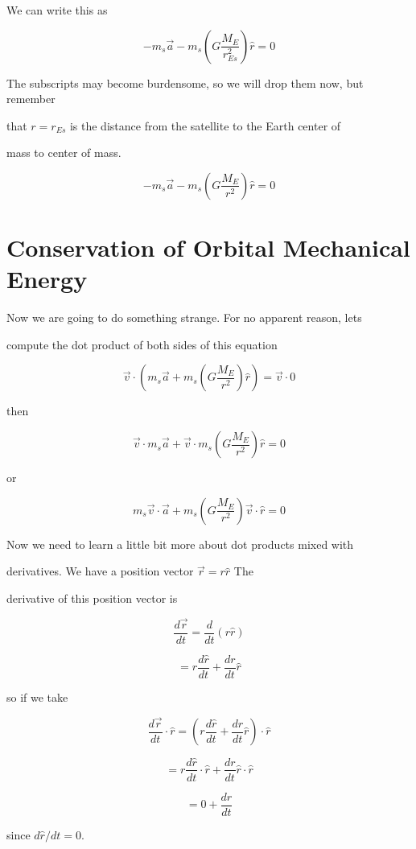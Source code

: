 We can write this as 

$$
-m_{s}\overrightarrow{a}-m_{s}\left( G\frac{M_{E}}{r_{Es}^{2}}\right) \hat{r}=0
$$


The subscripts may become burdensome, so we will drop them now, but remember

that $r=r_{Es}$ is the distance from the satellite to the Earth center of

mass to center of mass. 

$$-m_{s}\overrightarrow{a}-m_{s}\left( G\frac{M_{E}}{r^{2}}\right) \hat{r}=0$$


\section{Conservation of Orbital Mechanical Energy}


Now we are going to do something strange. For no apparent reason, lets

compute the dot product of both sides of this equation 

$$\overrightarrow{v}\cdot \left( m_{s}\overrightarrow{a}+m_{s}\left( G\frac{M_{E}}{r^{2}}\right) \hat{r}\right) =\overrightarrow{v}\cdot 0 $$

then 

$$\overrightarrow{v}\cdot m_{s}\overrightarrow{a}+\overrightarrow{v}\cdot m_{s}\left( G\frac{M_{E}}{r^{2}}\right) \hat{r}=0 $$

or

$$m_{s}\overrightarrow{v}\cdot \overrightarrow{a}+m_{s}\left( G\frac{M_{E}}{r^{2}}\right) \overrightarrow{v}\cdot \hat{r}=0 $$

Now we need to learn a little bit more about dot products mixed with

derivatives. We have a position vector $\overrightarrow{r}=r\hat{r}$ The

derivative of this position vector is 

$$\frac{d\overrightarrow{r}}{dt}=\frac{d}{dt}\left( r\hat{r}\right) $$

$$=r\frac{d\hat{r}}{dt}+\frac{dr}{dt}\hat{r}$$


so if we take 

$$\frac{d\overrightarrow{r}}{dt}\cdot \hat{r}=\left( r\frac{d\hat{r}}{dt}+\frac{dr}{dt}\hat{r}\right) \cdot \hat{r}$$


$$=r\frac{d\hat{r}}{dt}\cdot \hat{r}+\frac{dr}{dt}\hat{r}\cdot \hat{r}$$%

$$=0+\frac{dr}{dt}$$%

since $d\hat{r}/dt=0.$


